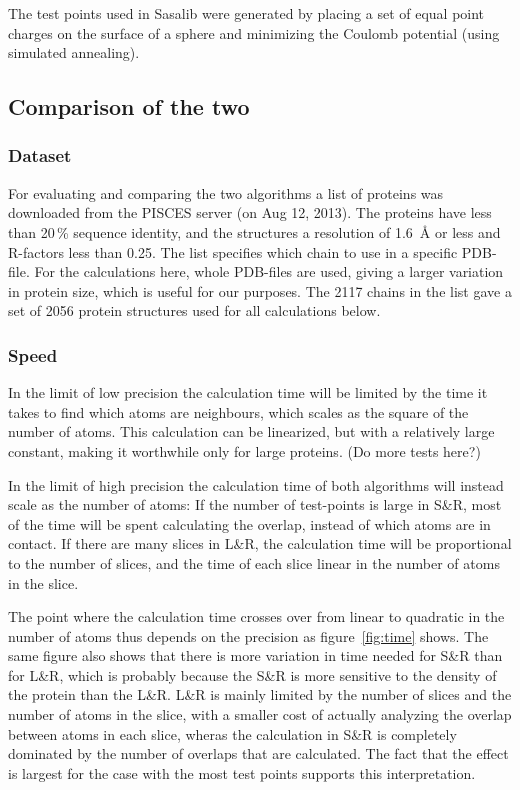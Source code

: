 \documentclass[a4paper,11pt]{article}
\begin{document}
The test points used in Sasalib were generated by placing a set of
equal point charges on the surface of a sphere and minimizing the Coulomb
potential (using simulated annealing).

\subsection{Comparison of the two}

\subsubsection{Dataset}

For evaluating and comparing the two algorithms a list of proteins was
downloaded from the PISCES server (on Aug 12, 2013). The proteins have
less than 20\,\% sequence identity, and the structures a resolution of
1.6~Å or less and R-factors less than 0.25. The list specifies which
chain to use in a specific PDB-file. For the calculations here, whole
PDB-files are used, giving a larger variation in protein size, which
is useful for our purposes. The 2117 chains in the list gave a set of
2056 protein structures used for all calculations below.

\subsubsection{Speed}

In the limit of low precision the calculation time will be limited by
the time it takes to find which atoms are neighbours, which scales as
the square of the number of atoms. This calculation can be linearized,
but with a relatively large constant, making it worthwhile only for
large proteins. (Do more tests here?)

In the limit of high precision the calculation time of both algorithms
will instead scale as the number of atoms: If the number of
test-points is large in S\&R, most of the time will be spent
calculating the overlap, instead of which atoms are in contact. If
there are many slices in L\&R, the calculation time will be
proportional to the number of slices, and the time of each
slice linear in the number of atoms in the slice. 

The point where the calculation time crosses over from linear to
quadratic in the number of atoms thus depends on the precision as
figure~\ref{fig:time} shows. The same figure also shows that there is
more variation in time needed for S\&R than for L\&R, which is
probably because the S\&R is more sensitive to the density of the
protein than the L\&R. L\&R is mainly limited by the number of slices
and the number of atoms in the slice, with a smaller cost of actually
analyzing the overlap between atoms in each slice, wheras the
calculation in S\&R is completely dominated by the number of overlaps
that are calculated. The fact that the effect is largest for the case
with the most test points supports this interpretation.
\end{document}
